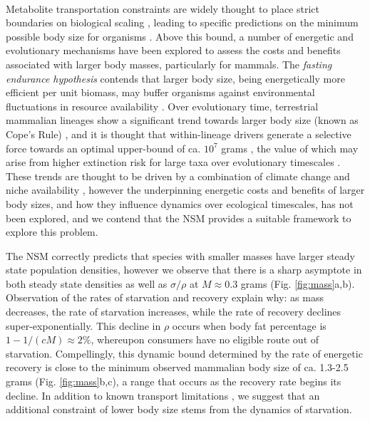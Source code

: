 \documentclass{pnastwo}
\begin{document}
\begin{article}
\vspace{2mm}
 \\ \nonumber
Metabolite transportation constraints are widely thought to place strict boundaries on biological scaling \cite{Brown:1993p708,West:1997cg,Brown:2004wq}, leading to specific predictions on the minimum possible body size for organisms \cite{West:2002ud}.
Above this bound, a number of energetic and evolutionary mechanisms have been explored to assess the costs and benefits associated with larger body masses, particularly for mammals.
The \emph{fasting endurance hypothesis} contends that larger body size, being energetically more efficient per unit biomass, may buffer organisms against environmental fluctuations in resource availability \cite{Millar:1990p923}.
Over evolutionary time, terrestrial mammalian lineages show a significant trend towards larger body size (known as Cope's Rule) \cite{Alroy:1998p1594,Clauset:2009fh,Smith:2010p3442,Saarinen:2014br}, and it is thought that within-lineage drivers generate a selective force towards an optimal upper-bound of ca. $10^7$ grams \cite{Alroy:1998p1594}, the value of which may arise from higher extinction risk for large taxa over evolutionary timescales \cite{Clauset:2009fh}.
These trends are thought to be driven by a combination of climate change and niche availability \cite{Saarinen:2014br}, however the underpinning energetic costs and benefits of larger body sizes, and how they influence dynamics over ecological timescales, has not been explored, and we contend that the NSM provides a suitable framework to explore this problem.

The NSM correctly predicts that species with smaller masses have larger steady state population densities, however we observe that there is a sharp asymptote in both steady state densities as well as $\sigma/\rho$ at $M \approx 0.3$ grams  (Fig. \ref{fig:mass}a,b).
Observation of the rates of starvation and recovery explain why: as mass decreases, the rate of starvation increases, while the rate of recovery declines super-exponentially.
This decline in $\rho$ occurs when body fat percentage is $1 - 1/(cM) \approx 2\%$, whereupon consumers have no eligible route out of starvation.
Compellingly, this dynamic bound determined by the rate of energetic recovery is close to the minimum observed mammalian body size of ca. 1.3-2.5 grams (Fig. \ref{fig:mass}b,c), a range that occurs as the recovery rate begins its decline.
In addition to known transport limitations \cite{West:2002ud}, we suggest that an additional constraint of lower body size stems from the dynamics of starvation.


\end{article}
\end{document}
